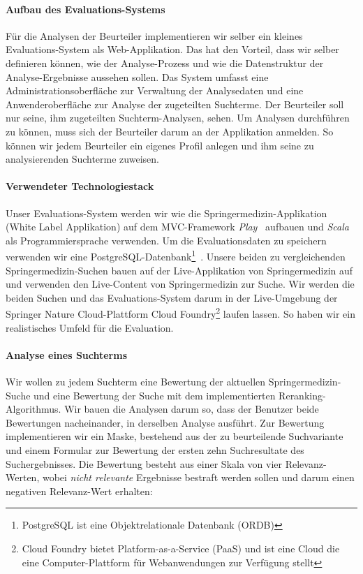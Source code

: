 \paragraph{Aufbau des Evaluations-Systems}
Für die Analysen der Beurteiler implementieren wir selber ein kleines Evaluations-System als Web-Applikation. Das hat den Vorteil, dass wir selber definieren können, wie der Analyse-Prozess und wie die Datenstruktur der Analyse-Ergebnisse aussehen sollen. Das System umfasst eine Administrationsoberfläche zur Verwaltung der Analysedaten und eine Anwenderoberfläche zur Analyse der zugeteilten Suchterme. Der Beurteiler soll nur seine, ihm zugeteilten Suchterm-Analysen, sehen. Um Analysen durchführen zu können, muss sich der Beurteiler darum an der Applikation anmelden. So können wir jedem Beurteiler ein eigenes Profil anlegen und ihm seine zu analysierenden Suchterme zuweisen. 

\paragraph{Verwendeter Technologiestack} 
Unser Evaluations-System werden wir wie die Springermedizin-Applikation (White Label Applikation) auf dem MVC-Framework \textit{Play}~\cite{Play} aufbauen und \textit{Scala}~\cite{Scala} als Programmiersprache verwenden. Um die Evaluationsdaten zu speichern verwenden wir eine PostgreSQL-Datenbank\footnote{PostgreSQL ist eine Objektrelationale Datenbank (ORDB)}~\cite{Postgresql}. Unsere beiden zu vergleichenden Springermedizin-Suchen bauen auf der Live-Applikation von Springermedizin auf und verwenden den Live-Content von Springermedizin zur Suche. Wir werden die beiden Suchen und das Evaluations-System darum in der Live-Umgebung der Springer Nature Cloud-Plattform Cloud Foundry\footnote{Cloud Foundry bietet Platform-as-a-Service  (PaaS) und ist eine Cloud die eine Computer-Plattform für Webanwendungen zur Verfügung stellt} laufen lassen. So haben wir ein realistisches Umfeld für die Evaluation. 

\paragraph{Analyse eines Suchterms}
Wir wollen zu jedem Suchterm eine Bewertung der aktuellen Springermedizin-Suche und eine Bewertung der Suche mit dem implementierten Reranking-Algorithmus. Wir bauen die Analysen darum so, dass der Benutzer beide Bewertungen nacheinander, in derselben Analyse ausführt. Zur Bewertung implementieren wir ein Maske, bestehend aus der zu beurteilende Suchvariante und einem Formular zur Bewertung der ersten zehn Suchresultate des Suchergebnisses. Die Bewertung besteht aus einer Skala von vier Relevanz-Werten, wobei \textit{nicht relevante} Ergebnisse bestraft werden sollen und darum einen negativen Relevanz-Wert erhalten:

